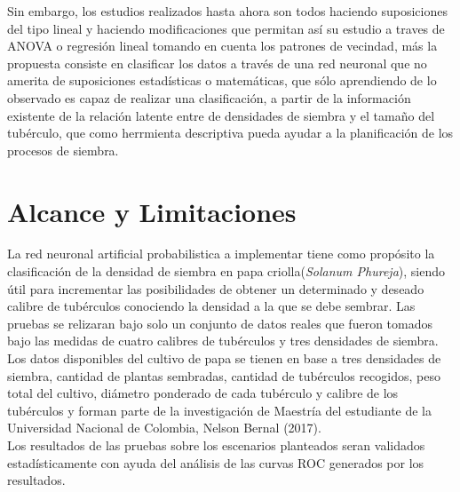 Sin embargo, los estudios realizados hasta ahora son todos haciendo suposiciones del tipo lineal y haciendo modificaciones que permitan así su estudio a traves de ANOVA o regresión lineal tomando en cuenta los patrones de vecindad, más la propuesta consiste en clasificar los datos a través de una red neuronal que no amerita de suposiciones estadísticas o matemáticas, que sólo aprendiendo de lo observado es capaz de realizar una clasificación, a partir de la información existente de la relaci\'on latente entre de densidades de siembra y el tamaño del tubérculo, que como herrmienta descriptiva pueda ayudar  a la planificaci\'on de los procesos de siembra.\\



\section{Alcance y Limitaciones}

La red neuronal artificial probabilistica a implementar tiene como propósito la clasificación de la densidad de siembra en papa criolla(\textit{Solanum Phureja}), siendo útil para incrementar las posibilidades de obtener un determinado y deseado calibre de tubérculos conociendo la densidad a la que se debe sembrar.  Las pruebas se relizaran bajo solo un conjunto de datos reales que fueron tomados bajo las medidas de cuatro calibres de tubérculos y tres densidades de siembra.\\

Los datos disponibles del cultivo de papa se tienen en base a tres densidades de siembra, cantidad de plantas sembradas, cantidad de tubérculos recogidos, peso total del cultivo, diámetro ponderado de cada tubérculo y calibre de los tubérculos y forman parte de la investigación de Maestría del estudiante de la Universidad Nacional de Colombia, Nelson Bernal (2017).\\

Los resultados de las pruebas sobre los escenarios planteados seran validados estadísticamente con ayuda del análisis de las curvas ROC generados por los resultados.\\

